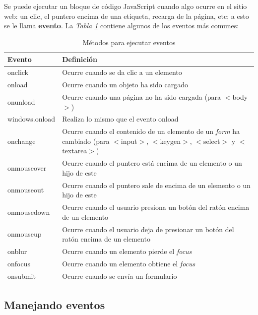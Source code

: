 Se puede ejecutar un bloque de código JavaScript cuando algo ocurre en el sitio web: un clic, el puntero encima de una etiqueta, recarga de la página, etc; a esto se le llama \textbf{evento}. La \textit{Tabla \ref{tab: 11}} contiene algunos de los eventos más comunes:
\begin{table}[H]
    \begin{center}
        \caption{Métodos para ejecutar eventos}
        \label{tab: 11}
        \begin{tabular}{m{3cm} m{10cm}}
            \hline
            \textbf{Evento} & \textbf{Definición} \\
            \hline
            onclick         & Ocurre cuando se da clic a un elemento \\
            onload          & Ocurre cuando un objeto ha sido cargado \\
            onunload        & Ocurre cuando una página no ha sido cargada (para $<$body$>$) \\
            windows.onload  & Realiza lo mismo que el evento onload \\
            onchange        & Ocurre cuando el contenido de un elemento de un \textit{form} ha cambiado (para $<$input$>$, $<$keygen$>$, $<$select$>$ y $<$textarea$>$) \\
            onmouseover     & Ocurre cuando el puntero está encima de un elemento o un hijo de este \\
            onmouseout      & Ocurre cuando el puntero sale de encima de un elemento o un hijo de este \\
            onmousedown     & Ocurre cuando el usuario presiona un botón del ratón encima de un elemento \\
            onmouseup       & Ocurre cuando el usuario deja de presionar un botón del ratón encima de un elemento \\
            onblur          & Ocurre cuando un elemento pierde el \textit{focus} \\
            onfocus         & Ocurre cuando un elemento obtiene el \textit{focus} \\
            onsubmit        & Ocurre cuando se envía un formulario \\
            \hline
        \end{tabular}
    \end{center}    
\end{table}


\subsection{Manejando eventos}

